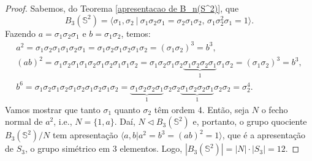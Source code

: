 	\begin{proof}
		Sabemos, do Teorema \ref{apresentacao de B_n(S^2)}, que
		\[
		B_3(\mathbb{S}^2) 
		= \langle \sigma_1,\sigma_2 \ | \ \sigma_1\sigma_2\sigma_1 
		= \sigma_2\sigma_1\sigma_2\text{, } \sigma_1\sigma_2^2\sigma_1 
		= 1\rangle.
		\]
		Fazendo $a = \sigma_1\sigma_2\sigma_1$ e $b = \sigma_1\sigma_2$, temos:
		\begin{align*}
    		a^2 
    		= \sigma_1\sigma_2\sigma_1\sigma_1\sigma_2\sigma_1 
    		= \sigma_1\sigma_2\sigma_1\sigma_2\sigma_1\sigma_2 
    		= (\sigma_1\sigma_2)^3 
    		= b^3, \\
    		(ab)^2 
    		= \sigma_1\sigma_2\sigma_1\sigma_1\sigma_2\sigma_1\sigma_2\sigma_1\sigma_1\sigma_2 
    		= \sigma_1\sigma_2\sigma_1\sigma_2
    		\underbrace{\sigma_1\sigma_2\sigma_2\sigma_1}_{1}\sigma_1\sigma_2 
    		= (\sigma_1\sigma_2)^3 
    		= b^3, \\
    		b^6 
    		= \sigma_1\sigma_2\sigma_1\sigma_2\sigma_1\sigma_2\sigma_1\sigma_2\sigma_1\sigma_2 
    		= \underbrace{\sigma_1\sigma_2\sigma_2\sigma_1}_{1}\sigma_2\sigma_2
    		\underbrace{\sigma_1\sigma_2\sigma_2\sigma_1}_{1}\sigma_2\sigma_2 
    		= \sigma_2^4.
		\end{align*}
		Vamos mostrar que tanto $\sigma_1$ quanto $\sigma_2$ têm ordem 4. Então, 
		seja $N$ o fecho normal de $a^2$, i.e., $N = \{1,a\}$. 
		Daí, $N\vartriangleleft B_3(\mathbb{S}^2)$ e, portanto, o grupo quociente 
		$B_3(\mathbb{S}^2)/N$ tem apresentação $\langle a,b|a^2=b^3=(ab)^2=1 \rangle$, 
		que é a apresentação de $S_3$, o grupo simétrico em $3$ elementos. Logo, 
		$|B_3(\mathbb{S}^2)| = |N|\cdot|S_3| = 12$.
		

\end{proof}
